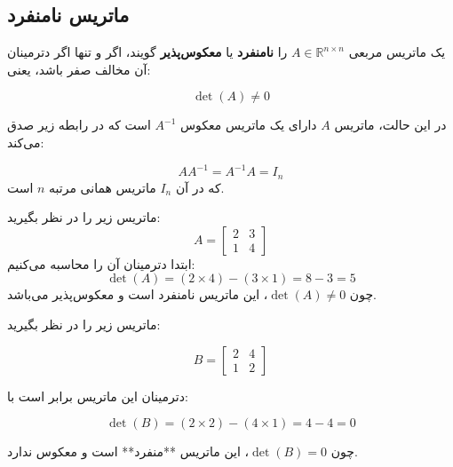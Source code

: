 \subsection{ ماتریس نامنفرد}
\begin{definition}
	یک ماتریس مربعی $A \in \mathbb{R}^{n \times n}$ را \textbf{نامنفرد} یا \textbf{معکوس‌پذیر} گویند، اگر و تنها اگر دترمینان آن مخالف صفر باشد، یعنی:
	
	\[
	\det(A) \neq 0
	\]
	
	در این حالت، ماتریس $A$ دارای یک ماتریس معکوس $A^{-1}$ است که  در رابطه زیر صدق می‌کند:
	
	\[
	A A^{-1} = A^{-1} A = I_n
	\]
	که در آن $I_n$ ماتریس همانی مرتبه $n$ است.
\end{definition}
\begin{example}
ماتریس زیر را در نظر بگیرید:
\[
A = \begin{bmatrix} 2 & 3 \\ 1 & 4 \end{bmatrix}
\]
ابتدا دترمینان آن را محاسبه می‌کنیم:
\[
\det(A) = (2 \times 4) - (3 \times 1) = 8 - 3 = 5
\]
چون $\det(A) \neq 0$، این ماتریس نامنفرد است و معکوس‌پذیر می‌باشد.
\end{example}
\begin{example}
	ماتریس زیر را در نظر بگیرید:
	
	\[
	B = \begin{bmatrix} 2 & 4 \\ 1 & 2 \end{bmatrix}
	\]
	
	دترمینان این ماتریس برابر است با:
	
	\[
	\det(B) = (2 \times 2) - (4 \times 1) = 4 - 4 = 0
	\]
	
	چون $\det(B) = 0$، این ماتریس **منفرد** است و معکوس ندارد.
\end{example}

